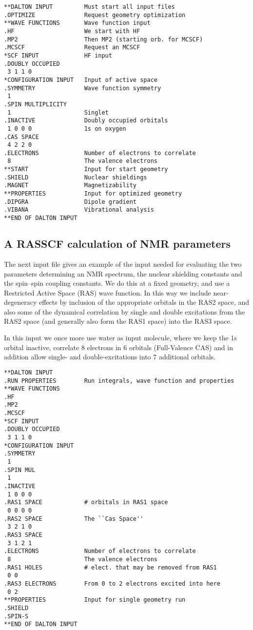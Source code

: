 \begin{verbatim}
**DALTON INPUT         Must start all input files
.OPTIMIZE              Request geometry optimization
**WAVE FUNCTIONS       Wave function input
.HF                    We start with HF
.MP2                   Then MP2 (starting orb. for MCSCF)
.MCSCF                 Request an MCSCF
*SCF INPUT             HF input
.DOUBLY OCCUPIED
 3 1 1 0
*CONFIGURATION INPUT   Input of active space
.SYMMETRY              Wave function symmetry
 1
.SPIN MULTIPLICITY
 1                     Singlet
.INACTIVE              Doubly occupied orbitals
 1 0 0 0               1s on oxygen
.CAS SPACE
 4 2 2 0
.ELECTRONS             Number of electrons to correlate
 8                     The valence electrons
**START                Input for start geometry
.SHIELD                Nuclear shieldings
.MAGNET                Magnetizability
**PROPERTIES           Input for optimized geometry
.DIPGRA                Dipole gradient
.VIBANA                Vibrational analysis
**END OF DALTON INPUT
\end{verbatim}

\subsection{A RASSCF calculation of NMR parameters}

The next input file gives an example of the input needed for
evaluating the two parameters determining an NMR spectrum, the nuclear
shielding constants and the spin--spin
coupling constants. We do this
at a fixed geometry, and use a Restricted Active Space (RAS) wave
function. In this way we include near-degeneracy effects by inclusion
of the appropriate orbitals in the RAS2 space, and also some of the
dynamical correlation  by single and
double excitations
from the RAS2 space (and generally also form the RAS1 space) into the
RAS3 space.

In this input we once more use water as input molecule,
where we keep
the 1s orbital inactive, correlate 8 electrons in 6 orbitals (Full-Valence
CAS) and in addition allow single- and double-excitations into
7 additional orbitals.

\begin{verbatim}
**DALTON INPUT
.RUN PROPERTIES        Run integrals, wave function and properties
**WAVE FUNCTIONS
.HF
.MP2
.MCSCF
*SCF INPUT
.DOUBLY OCCUPIED
 3 1 1 0
*CONFIGURATION INPUT
.SYMMETRY
 1
.SPIN MUL
 1
.INACTIVE
 1 0 0 0
.RAS1 SPACE            # orbitals in RAS1 space
 0 0 0 0
.RAS2 SPACE            The ``Cas Space''
 3 2 1 0
.RAS3 SPACE
 3 1 2 1
.ELECTRONS             Number of electrons to correlate
 8                     The valence electrons
.RAS1 HOLES            # elect. that may be removed from RAS1
 0 0
.RAS3 ELECTRONS        From 0 to 2 electrons excited into here
 0 2
**PROPERTIES           Input for single geometry run
.SHIELD
.SPIN-S
**END OF DALTON INPUT
\end{verbatim}

